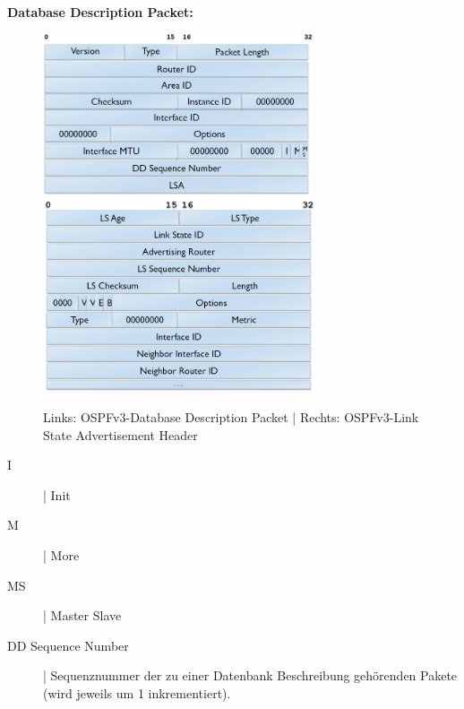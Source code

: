 \documentclass{article} %
\begin{document}
\textbf{Database Description Packet:}
\begin{figure}[h]
	\begin{center}
		\includegraphics[width=8cm]{img/ospf_dbp}
		\includegraphics[width=8cm]{img/ospf_ls_header}
		\caption{Links: OSPFv3-Database Description Packet | Rechts: OSPFv3-Link State Advertisement Header}
	\end{center}
\end{figure}

\begin{description}
	\item [I] | Init
	\item [M] | More
	\item [MS] | Master Slave
	\item [DD Sequence Number] | Sequenznummer der zu einer Datenbank Beschreibung gehörenden Pakete (wird jeweils um 1 inkrementiert).
\end{description}
\end{document}
